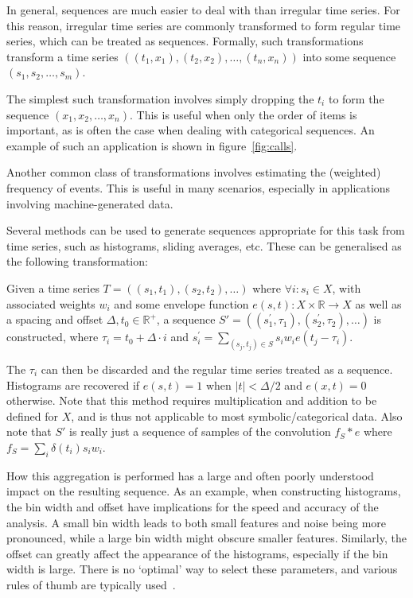 In general, sequences are much easier to deal with than irregular time series. For this reason, irregular time series are commonly transformed to form regular time series, which can be treated as sequences. Formally, such transformations transform a time series $((t_1, x_1), (t_2, x_2), \ldots, (t_n, x_n))$ into some sequence $(s_1, s_2, \ldots, s_m)$.

The simplest such transformation involves simply dropping the $t_i$ to form the sequence $(x_1, x_2, \ldots, x_n)$. This is useful when only the order of items is important, as is often the case when dealing with categorical sequences. An example of such an application is shown in figure~\ref{fig:calls}.

Another common class of transformations involves estimating the (weighted) frequency of events. This is useful in many scenarios, especially in applications involving machine-generated data.

Several methods can be used to generate sequences appropriate for this task from time series, such as histograms, sliding averages, etc. These can be generalised as the following transformation:

Given a time series $T = ((s_1, t_1), (s_2, t_2), \dots)$ where $\forall i: s_i \in X$, with associated weights $w_i$ and some envelope function $e(s, t): X \times \mathbb{R} \rightarrow X$ as well as a spacing and offset $\Delta, t_0 \in \mathbb{R}^+$, a sequence $S' = ((s_{1}^{'}, \tau_1), (s_{2}^{'}, \tau_2), \dots)$ is constructed, where $\tau_i = t_0 + \Delta \cdot i$ and $s_{i}^{'} = \sum_{(s_j, t_j) \in S} s_i w_i e(t_j - \tau_i)$.

The $\tau_i$ can then be discarded and the regular time series treated as a sequence. Histograms are recovered if $e(s, t) = 1$ when $|t| < \Delta/2$ and $e(x, t) = 0$ otherwise. Note that this method requires multiplication and addition to be defined for $X$, and is thus not applicable to most symbolic/categorical data. Also note that $S'$ is really just a sequence of samples of the convolution $f_S \ast e$ where $f_S = \sum_i \delta(t_i) s_i w_i$.

How this aggregation is performed has a large and often poorly understood impact on the resulting sequence. As an example, when constructing histograms, the bin width and offset have implications for the speed and accuracy of the analysis. A small bin width leads to both small features and noise being more pronounced, while a large bin width might obscure smaller features. Similarly, the offset can greatly affect the appearance of the histograms, especially if the bin width is large. There is no `optimal' way to select these parameters, and various rules of thumb are typically used~\cite{density_estimation}.

